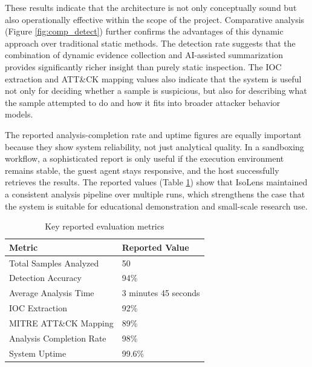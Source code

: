 \documentclass[a4paper,12pt,oneside]{report}
\begin{document}
\par

\par

These results indicate that the architecture is not only conceptually sound but also operationally effective within the scope of the project. Comparative analysis (Figure \ref{fig:comp_detect}) further confirms the advantages of this dynamic approach over traditional static methods. The detection rate suggests that the combination of dynamic evidence collection and AI-assisted summarization provides significantly richer insight than purely static inspection. The IOC extraction and ATT\&CK mapping values also indicate that the system is useful not only for deciding whether a sample is suspicious, but also for describing what the sample attempted to do and how it fits into broader attacker behavior models.

\par

\par

The reported analysis-completion rate and uptime figures are equally important because they show system reliability, not just analytical quality. In a sandboxing workflow, a sophisticated report is only useful if the execution environment remains stable, the guest agent stays responsive, and the host successfully retrieves the results. The reported values (Table \ref{tab:eval_metrics}) show that IsoLens maintained a consistent analysis pipeline over multiple runs, which strengthens the case that the system is suitable for educational demonstration and small-scale research use.

\begin{table}[H]
\centering
\caption{Key reported evaluation metrics}
\label{tab:eval_metrics}
\begin{tabularx}{\textwidth}{>{\raggedright\arraybackslash}p{6cm}X}
\toprule
\textbf{Metric} & \textbf{Reported Value} \\
\midrule
Total Samples Analyzed & 50 \\
Detection Accuracy & 94\% \\
Average Analysis Time & 3 minutes 45 seconds \\
IOC Extraction & 92\% \\
MITRE ATT\&CK Mapping & 89\% \\
Analysis Completion Rate & 98\% \\
System Uptime & 99.6\% \\
\bottomrule
\end{tabularx}
\end{table}
\end{document}
